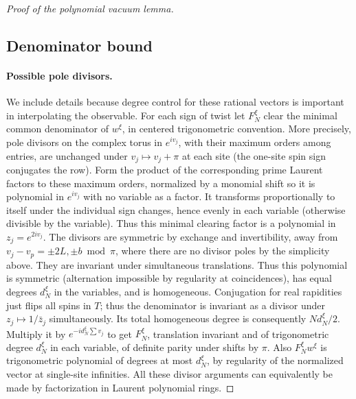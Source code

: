 \begin{proof}[Proof of the polynomial vacuum lemma]
\subsection{Denominator bound}\label{c6:subheading-05}

\paragraph{Possible pole divisors.}
We include details because degree control for these rational vectors is important in interpolating the observable. For each sign of twist let \(F_N^\xi\) clear the minimal common denominator of \(w^\xi\), in centered trigonometric convention. More precisely, pole divisors on the complex torus in \(e^{iv_j}\), with their maximum orders among entries, are unchanged under \(v_j\mapsto v_j+\pi\) at each site (the one-site spin sign conjugates the row). Form the product of the corresponding prime Laurent factors to these maximum orders, normalized by a monomial shift so it is polynomial in \(e^{iv_j}\) with no variable as a factor. It transforms proportionally to itself under the individual sign changes, hence evenly in each variable (otherwise divisible by the variable). Thus this minimal clearing factor is a polynomial in \(z_j=e^{2iv_j}\). The divisors are symmetric by exchange and invertibility, away from \(v_j-v_p=\pm2L,\pm b\bmod\pi\), where there are no divisor poles by the simplicity above. They are invariant under simultaneous translations. Thus this polynomial is symmetric (alternation impossible by regularity at coincidences), has equal degrees \(d_N^\xi\) in the variables, and is homogeneous. Conjugation for real rapidities just flips all spins in \(T\); thus the denominator is invariant as a divisor under \(z_j\mapsto1/\bar z_j\) simultaneously. Its total homogeneous degree is consequently \(N d_N^\xi/2\). Multiply it by \(e^{-i d_N^\xi\sum v_j}\) to get \(F_N^\xi\), translation invariant and of trigonometric degree \(d_N^\xi\) in each variable, of definite parity under shifts by \(\pi\). Also \(F_N^\xi w^\xi\) is trigonometric polynomial of degrees at most \(d_N^\xi\), by regularity of the normalized vector at single-site infinities. All these divisor arguments can equivalently be made by factorization in Laurent polynomial rings.


\end{proof}
